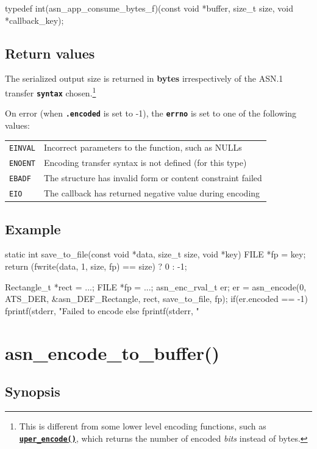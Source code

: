 \documentclass[english,oneside,12pt]{book}
\newcommand{\apisection}[2]{\clearpage\section{\label{#1}#2}}
\newcommand{\api}[2]{\hyperref[#1]{\code{#2}}}
\newcommand{\code}[1]{\texttt{\textbf{\lstinline{#1}}}}
\begin{document}
\begin{signature}
typedef int(asn_app_consume_bytes_f)(const void *buffer, size_t size, void *callback_key);
\end{signature}

\subsection*{Return values}


The serialized output size is returned in \textbf{bytes} irrespectively of the
ASN.1 transfer \code{syntax} chosen.\footnote{This is different from some
lower level encoding functions, such as \api{sec:uper_encode}{uper_encode()},
which returns the number of encoded \emph{bits} instead of bytes.}

On error (when \code{.encoded} is set to -1),
the \code{errno} is set to one of the following values:

\begin{tabular}[h!]{ll}
\texttt{EINVAL} & Incorrect parameters to the function, such as NULLs \\
\texttt{ENOENT} & Encoding transfer syntax is not defined (for this type) \\
\texttt{EBADF} & The structure has invalid form or content constraint failed \\
\texttt{EIO} & The callback has returned negative value during encoding
\end{tabular}

\subsection*{Example}
\begin{example}
static int
save_to_file(const void *data, size_t size, void *key) {
    FILE *fp = key;
    return (fwrite(data, 1, size, fp) == size) ? 0 : -1;
}

Rectangle_t *rect = ...;
FILE *fp = ...;
asn_enc_rval_t er;
er = asn_encode(0, ATS_DER, &asn_DEF_Rectangle, rect, save_to_file, fp);
if(er.encoded == -1) {
   fprintf(stderr, "Failed to encode %
} else {
   fprintf(stderr, "%
}
\end{example}

\apisection{sec:asn_encode_to_buffer}{asn\_encode\_to\_buffer()}

\subsection*{Synopsis}
\end{document}
